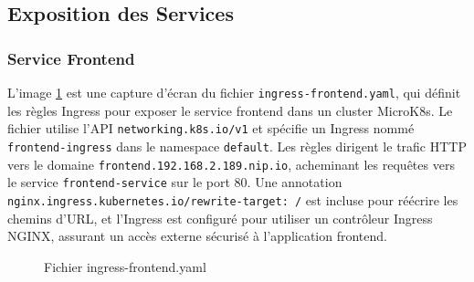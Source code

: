 \subsection{Exposition des Services}
\subsubsection{Service Frontend}
L'image \ref{fig:fring} est une capture d’écran du fichier \texttt{ingress-frontend.yaml}, qui définit les règles Ingress pour exposer le service frontend dans un cluster MicroK8s. Le fichier utilise l’API \texttt{networking.k8s.io/v1} et spécifie un Ingress nommé \texttt{frontend-ingress} dans le namespace \texttt{default}. Les règles dirigent le trafic HTTP vers le domaine \texttt{frontend.192.168.2.189.nip.io}, acheminant les requêtes vers le service \texttt{frontend-service} sur le port 80. Une annotation \texttt{nginx.ingress.kubernetes.io/rewrite-target: /} est incluse pour réécrire les chemins d’URL, et l’Ingress est configuré pour utiliser un contrôleur Ingress NGINX, assurant un accès externe sécurisé à l’application frontend.
\newpage
\begin{figure}[h]
    \begin{adjustwidth}{-3.5cm}{-3.5cm}
    \centering
    \caption{Fichier ingress-frontend.yaml}
    \label{fig:fring}
    \end{adjustwidth}
\end{figure}
